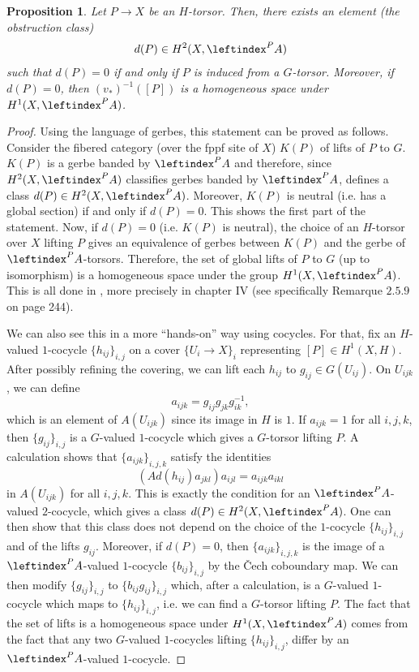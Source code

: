 \documentclass[a4paper,english,12pt]{amsart}
\newtheorem{proposition}[definition]{Proposition}
\numberwithin{equation}{section}
\renewcommand{\_}{\rule{0.25cm}{0.4pt}}
\begin{document}
\begin{proposition}\label{obstruction class}
Let $P\to X$ be an $H$-torsor. Then, there exists an element (the obstruction class)
\[
d(P)\in H^2(X,\leftindex^{P}{A})
\]
such that $d(P)=0$ if and only if $P$ is induced from a $G$-torsor. Moreover, if $d(P)=0$, then $(v_{\ast})^{-1}([P])$ is a homogeneous space under $H^{1}(X,\leftindex^{P}{A})$.
\end{proposition}
\begin{proof}
Using the language of gerbes, this statement can be proved as follows. Consider the fibered category (over the fppf site of $X$) $K(P)$ of lifts of $P$ to $G$. $K(P)$ is a gerbe banded by $\leftindex^{P}{A}$ and therefore, since $H^{2}(X,\leftindex^{P}{A})$ classifies gerbes banded by $\leftindex^{P}{A}$, defines a class $d(P)\in H^{2}(X,\leftindex^{P}{A})$. Moreover, $K(P)$ is neutral (i.e. has a global section) if and only if $d(P)=0$. This shows the first part of the statement. Now, if $d(P)=0$ (i.e. $K(P)$ is neutral), the choice of an $H$-torsor over $X$ lifting $P$ gives an equivalence of gerbes between $K(P)$ and the gerbe of $\phantom{ }\leftindex^{P}{A}$-torsors. Therefore, the set of global lifts of $P$ to $G$ (up to isomorphism) is a homogeneous space under the group $H^{1}(X,\leftindex^{P}{A})$. This is all done in \cite{GiraudCNA}, more precisely in chapter IV (see specifically Remarque $2.5.9$ on page 244).

We can also see this in a more ``hands-on'' way using cocycles. For that, fix an $H$-valued $1$-cocycle $\{h_{ij}\}_{i,j}$ on a cover $\{U_{i}\to X\}_{i}$ representing $[P]\in H^{1}(X,H)$. After possibly refining the covering, we can lift each $h_{ij}$ to $g_{ij}\in G(U_{ij})$. On $U_{ijk}$, we can define
\[
a_{ijk}=g_{ij}g_{jk}g^{-1}_{ik},
\]
which is an element of $A(U_{ijk})$ since its image in $H$ is $1$. If $a_{ijk}=1$ for all $i,j,k$, then $\{g_{ij}\}_{i,j}$ is a $G$-valued $1$-cocycle which gives a $G$-torsor lifting $P$. A calculation shows that $\{a_{ijk}\}_{i,j,k}$ satisfy the identities
\[
(Ad(h_{ij})a_{jkl})a_{ijl}=a_{ijk}a_{ikl}
\]
in $A(U_{ijk})$ for all $i,j,k$. This is exactly the condition for an $\leftindex^{P}{A}$-valued $2$-cocycle, which gives a class $d(P)\in H^{2}(X,\leftindex^{P}{A})$. One can then show that this class does not depend on the choice of the $1$-cocycle $\{h_{ij}\}_{i,j}$ and of the lifts $g_{ij}$. Moreover, if $d(P)=0$, then $\{a_{ijk}\}_{i,j,k}$ is the image of a $\leftindex^{P}{A}$-valued $1$-cocycle $\{b_{ij}\}_{i,j}$ by the Čech coboundary map. We can then modify $\{g_{ij}\}_{i,j}$ to $\{b_{ij}g_{ij}\}_{i,j}$ which, after a calculation, is a $G$-valued $1$-cocycle which maps to $\{h_{ij}\}_{i,j}$, i.e. we can find a $G$-torsor lifting $P$. The fact that the set of lifts is a homogeneous space under $H^{1}(X,\leftindex^{P}{A})$ comes from the fact that any two $G$-valued $1$-cocycles lifting $\{h_{ij}\}_{i,j}$, differ by an $\leftindex^{P}{A}$-valued $1$-cocycle.
\end{proof}
\end{document}
